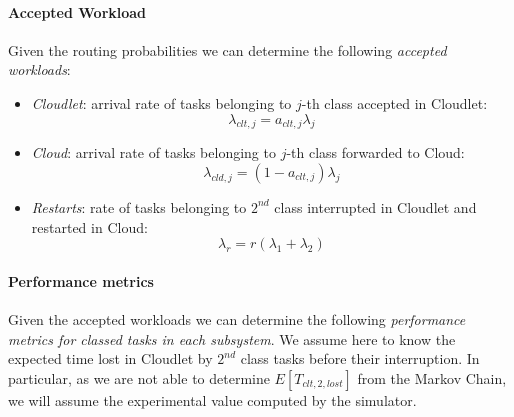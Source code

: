 \paragraph{Accepted Workload}
Given the routing probabilities we can determine the following \textit{accepted workloads}:

\begin{itemize}
	\item \textit{Cloudlet}: arrival rate of tasks belonging to $j$-th class accepted in Cloudlet:
	\begin{equation}
	\lambda_{clt,j} = a_{clt,j}\lambda_{j}
	\end{equation}
	
	\item \textit{Cloud}: arrival rate of tasks belonging to $j$-th class forwarded to Cloud:
	\begin{equation}
	\lambda_{cld,j} = (1-a_{clt,j})\lambda_{j}
	\end{equation}
	
	\item \textit{Restarts}: rate of tasks belonging to $2^{nd}$ class interrupted in Cloudlet and restarted in Cloud:
	\begin{equation}
	\lambda_{r} = r(\lambda_{1}+\lambda_{2})
	\end{equation}
\end{itemize}

\paragraph{Performance metrics}
Given the accepted workloads we can determine the following \textit{performance metrics for classed tasks in each subsystem}.
%
We assume here to know the expected time lost in Cloudlet by $2^{nd}$ class tasks before their interruption. In particular, as we are not able to determine $E[T_{clt,2,lost}]$ from the Markov Chain, we will assume the experimental value computed by the simulator.

